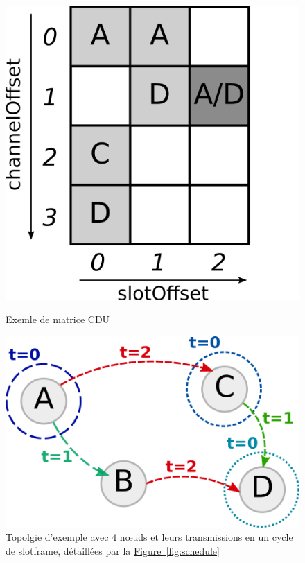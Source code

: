 \documentclass[]{report}
\newcommand{\wordlink}[2]{\hyperref[#2]{#1~\ref{#2}}}
\begin{document}
\begin{figure}[!ht]
	\centering
	\hfill
	\begin{minipage}{0.34\textwidth}
		\centering
		\includegraphics[width=\textwidth]{TSCH_basics_matrix}
		\caption{Exemle de matrice CDU}
		\label{fig:matCDU}
	\end{minipage}\hfill
	\begin{minipage}{0.45\textwidth}
		\centering
		\includegraphics[width=\textwidth]{TSCH_basics_graph}
		\caption{Topolgie d'exemple avec 4 nœuds et leurs transmissions en un cycle de slotframe, détaillées par la \wordlink{Figure}{fig:schedule}}
		\label{fig:topograph}
	\end{minipage}
	\hfill
\end{figure}
\end{document}
